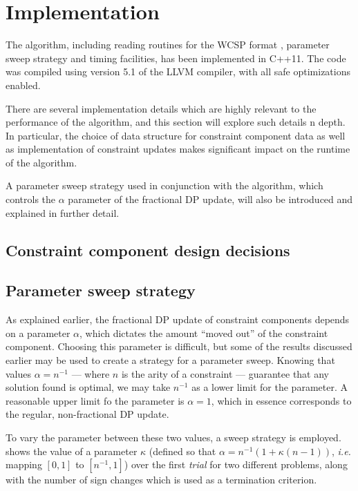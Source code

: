\section{Implementation}
The algorithm, including reading routines for the WCSP format \parencite{wcspformat}, parameter sweep strategy and timing facilities, has been implemented in C++11.
The code was compiled using version 5.1 of the LLVM compiler, with all safe optimizations enabled.

There are several implementation details which are highly relevant to the performance of the algorithm, and this section will explore such details n depth.
In particular, the choice of data structure for constraint component data as well as implementation of constraint updates makes significant impact on the runtime of the algorithm.

A parameter sweep strategy used in conjunction with the algorithm, which controls the \(\alpha\) parameter of the fractional DP update, will also be introduced and explained in further detail.

\subsection{Constraint component design decisions}

\subsection{Parameter sweep strategy}
As explained earlier, the fractional DP update of constraint components depends on a parameter \(\alpha\), which dictates the amount \enquote{moved out} of the constraint component.
Choosing this parameter is difficult, but some of the results discussed earlier may be used to create a strategy for a parameter sweep.
Knowing that values \(\alpha=n^{-1}\) --- where \(n\) is the arity of a constraint --- guarantee that any solution found is optimal, we may take \(n^{-1}\) as a lower limit for the parameter.
A reasonable upper limit fo the parameter is \(\alpha=1\), which in essence corresponds to the regular, non-fractional DP update.

To vary the parameter between these two values, a sweep strategy is employed.
 shows the value of a parameter \(\kappa\) (defined so that \(\alpha = n^{-1}\left(1 + \kappa(n - 1)\right)\), \emph{i.e.} mapping \(\left[0,1\right]\) to \(\left[n^{-1},1\right]\)) over the first \emph{trial} for two different problems, along with the number of sign changes which is used as a termination criterion.

